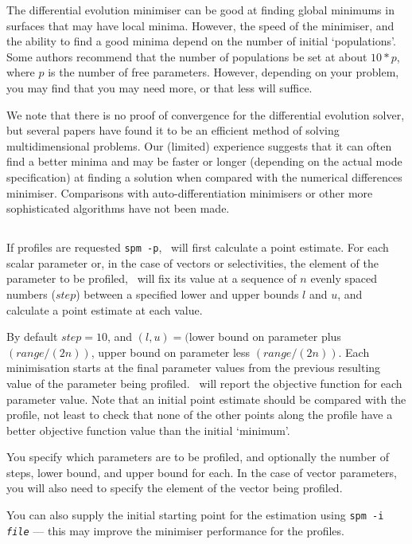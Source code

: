 The differential evolution minimiser can be good at finding global minimums in surfaces that may have local minima. However, the speed of the minimiser, and the ability to find a good minima depend on the number of initial `populations'. Some authors recommend that the number of populations be set at about $10*p$, where $p$ is the number of free parameters. However, depending on your problem, you may find that you may need more, or that less will suffice.

We note that there is no proof of convergence for the differential evolution solver, but several papers have found it to be an efficient method of solving multidimensional problems. Our (limited) experience suggests that it can often find a better minima and may be faster or longer (depending on the actual mode specification) at finding a solution when compared with the numerical differences minimiser. Comparisons with auto-differentiation minimisers or other more sophisticated algorithms have not been made. 

\subsection{\label{sec:estimate-profiles}}

If profiles are requested \texttt{spm -p}, \SPM\ will first calculate a point estimate. For each scalar parameter or, in the case of vectors or selectivities, the element of the parameter to be profiled, \SPM\ will fix its value at a sequence of $n$ evenly spaced numbers ($step$) between a specified lower and upper bounds $l$ and $u$, and calculate a point estimate at each value. 

By default $step=10$, and $(l, u)=($lower bound on parameter plus $(range/(2n))$, upper bound on parameter less $(range/(2n))$. Each minimisation starts at the final parameter values from the previous resulting value of the parameter being profiled. \SPM\ will report the objective function for each parameter value. Note that an initial point estimate should be compared with the profile, not least to check that none of the other points along the profile have a better objective function value than the initial `minimum'.

You specify which parameters are to be profiled, and optionally the number of steps, lower bound, and upper bound for each. In the case of vector parameters, you will also need to specify the element of the vector being profiled. 

You can also supply the initial starting point for the estimation using \texttt{spm -i \emph{file}} --- this may improve the minimiser performance for the profiles.

